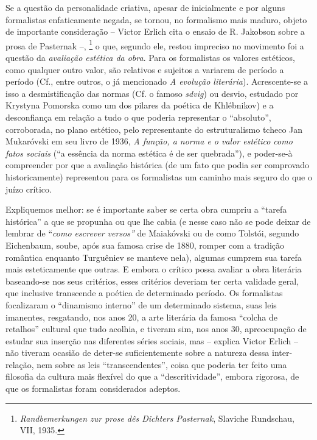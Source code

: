 Se a questão da personalidade criativa, apesar de inicialmente e por
alguns formalistas enfaticamente negada, se tornou, no formalismo mais
maduro, objeto de importante consideração -- Victor Erlich cita o ensaio
de R. Jakobson sobre a prosa de Pasternak --, \footnote{\emph{Randbemerkungen
  zur prose dês Dichters Pasternak}, Slaviche Rundschau, VII, 1935.} o
que, segundo ele, restou impreciso no movimento foi a questão da
\emph{avaliação estética da obra}. Para os formalistas os valores
estéticos, como qualquer outro valor, são relativos e sujeitos a
variarem de período a período (Cf., entre outros, o já mencionado
\emph{A evolução literária}). Acrescente-se a isso a desmistificação das
normas (Cf. o famoso \emph{sdvig}) ou desvio, estudado por Krystyna
Pomorska como um dos pilares da poética de Khlébnikov) e a desconfiança
em relação a tudo o que poderia representar o ``absoluto'', corroborada,
no plano estético, pelo representante do estruturalismo tcheco Jan
Mukaróvski em seu livro de 1936, \emph{A função, a norma e o valor
estético como fatos sociais} (``a essência da norma estética é de ser
quebrada''), e poder-se-à compreender por que a avaliação histórica (de
um fato que podia ser comprovado historicamente) representou para os
formalistas um caminho mais seguro do que o juízo crítico.

Expliquemos melhor: se é importante saber se certa obra cumpriu a
``tarefa histórica'' a que se propunha ou que lhe cabia (e nesse caso
não se pode deixar de lembrar de ``\emph{como escrever versos''} de
Maiakóvski ou de como Tolstói, segundo Eichenbaum, soube, após sua
famosa crise de 1880, romper com a tradição romântica enquanto
Turguêniev se manteve nela), algumas cumprem sua tarefa mais
esteticamente que outras. E embora o crítico possa avaliar a obra
literária baseando-se nos seus critérios, esses critérios deveriam ter
certa validade geral, que inclusive transcende a poética de determinado
período. Os formalistas focalizaram o ``dinamismo interno'' de um
determinado sistema, suas leis imanentes, resgatando, nos anos 20, a
arte literária da famosa ``colcha de retalhos'' cultural que tudo
acolhia, e tiveram sim, nos anos 30, apreocupação de estudar sua
inserção nas diferentes séries sociais, mas -- explica Victor Erlich --
não tiveram ocasião de deter-se suficientemente sobre a natureza dessa
inter-relação, nem sobre as leis ``transcendentes'', coisa que poderia
ter feito uma filosofia da cultura mais flexível do que a
``descritividade'', embora rigorosa, de que os formalistas foram
considerados adeptos.

